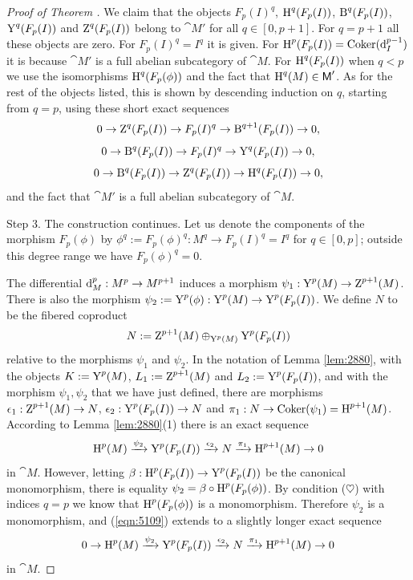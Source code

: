 \begin{proof}[Proof of Theorem \tup{\ref{thm:2880}}]
We claim that the objects 
$F_p(I)^q$, $\operatorname{H}^q(F_p(I))$, 
$\operatorname{B}^{q}(F_p(I))$, $\operatorname{Y}^{q}(F_p(I))$ and 
$\operatorname{Z}^{q}(F_p(I))$ belong to $\cat{M}'$ for all $q \in [0, p + 1]$. 
For $q = p + 1$ all these objects are zero. 
For $F_p(I)^q = I^q$ it is given. For 
$\operatorname{H}^p(F_p(I)) = \operatorname{Coker}(\mathrm{d}_I^{p - 1})$ it is because $\cat{M}'$ is 
a full abelian subcategory of $\cat{M}$. For $\operatorname{H}^q(F_p(I))$ when 
$q < p$ we use the isomorphisms $\operatorname{H}^q(F_p(\phi))$ and the fact that 
$\operatorname{H}^q(M) \in \operatorname{\mathsf{M}}'$. As for the rest of the objects listed, this is 
shown by descending induction on $q$, starting from $q = p$, using these short 
exact sequences 
\[ 0 \to \operatorname{Z}^{q}(F_p(I)) \to F_p(I)^{q} \to 
\operatorname{B}^{q + 1}(F_p(I)) \to  0 , \]
\[ 0 \to \operatorname{B}^{q}(F_p(I)) \to F_p(I)^q \to \operatorname{Y}^{q}(F_p(I)) \to  0 , \]
\[ 0 \to \operatorname{B}^{q}(F_p(I)) \to \operatorname{Z}^{q}(F_p(I)) \to 
\operatorname{H}^{q}(F_p(I)) \to  0 , \]
and the fact that $\cat{M}'$ is a full abelian subcategory of $\cat{M}$. 

\medskip \noindent
Step 3. The construction continues. Let us denote the components of the 
morphism $F_p(\phi)$ by
$\phi^q := F_p(\phi)^q : M^q \to F_p(I)^q = I^q$
for $q \in [0, p]$; outside this degree range we have $F_p(\phi)^q = 0$. 

The differential $\mathrm{d}_M^{p} : M^{p} \to M^{p + 1}$
induces a morphism $\psi_1 : \operatorname{Y}^p(M) \to \operatorname{Z}^{p + 1}(M)$.
There is also the morphism 
$\psi_2 := \operatorname{Y}^p(\phi) : \operatorname{Y}^p(M) \to \operatorname{Y}^{p}(F_p(I))$.
We define $N$ to be the fibered coproduct
\begin{equation} \label{eqn:5107}
N := \operatorname{Z}^{p + 1}(M) \oplus_{\operatorname{Y}^p(M)} \operatorname{Y}^{p}(F_p(I))
\end{equation}
relative to the morphisms $\psi_1$ and $\psi_2$. 
In the notation of Lemma \ref{lem:2880}, with the objects  $K := \operatorname{Y}^p(M)$, 
$L_1 := \operatorname{Z}^{p + 1}(M)$ and $L_2 := \operatorname{Y}^{p}(F_p(I))$,
and with the morphism $\psi_1, \psi_2$ that we have just defined, there are 
morphisms 
$\epsilon_1 : \operatorname{Z}^{p + 1}(M) \to N$,
$\epsilon_2 : \operatorname{Y}^{p}(F_p(I)) \to N$ and
$\pi_1 : N \to \operatorname{Coker}(\psi_1) = \operatorname{H}^{p + 1}(M)$.
According to Lemma \ref{lem:2880}(1) there is an exact sequence 
\begin{equation} \label{eqn:5109}
\operatorname{H}^{p}(M) \xrightarrow{\psi_2} \operatorname{Y}^{p}(F_p(I)) \xrightarrow{\epsilon_2} 
N \xrightarrow{\pi_1} \operatorname{H}^{p + 1}(M) \to 0 
\end{equation}
in $\cat{M}$. 
However, letting 
$\beta : \operatorname{H}^{p}(F_p(I)) \to \operatorname{Y}^{p}(F_p(I))$ 
be the canonical monomorphism, there is equality 
$\psi_2 = \beta \circ \operatorname{H}^p(F_p(\phi))$. By condition ($\heartsuit$) with 
indices $q = p$ we know that $\operatorname{H}^p(F_p(\phi))$ is a monomorphism. 
Therefore $\psi_2$ is a monomorphism, and (\ref{eqn:5109}) extends to a 
slightly longer exact sequence 
\begin{equation} \label{eqn:5115}
0 \to \operatorname{H}^{p}(M) \xrightarrow{\psi_2} \operatorname{Y}^{p}(F_p(I)) \xrightarrow{\epsilon_2} 
N \xrightarrow{\pi_1} \operatorname{H}^{p + 1}(M) \to 0 
\end{equation}
in $\cat{M}$. 


\end{proof}

